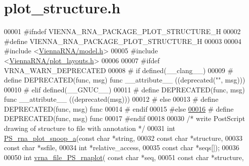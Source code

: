 \hypertarget{plot__structure_8h_source}{}\section{plot\+\_\+structure.\+h}
\label{plot__structure_8h_source}

\begin{DoxyCode}
00001 \textcolor{preprocessor}{#ifndef VIENNA\_RNA\_PACKAGE\_PLOT\_STRUCTURE\_H}
00002 \textcolor{preprocessor}{#define VIENNA\_RNA\_PACKAGE\_PLOT\_STRUCTURE\_H}
00003 
00004 \textcolor{preprocessor}{#include <\mbox{\hyperlink{model_8h}{ViennaRNA/model.h}}>}
00005 \textcolor{preprocessor}{#include <\mbox{\hyperlink{plot__layouts_8h}{ViennaRNA/plot\_layouts.h}}>}
00006 
00007 \textcolor{preprocessor}{#ifdef VRNA\_WARN\_DEPRECATED}
00008 \textcolor{preprocessor}{# if defined(\_\_clang\_\_)}
00009 \textcolor{preprocessor}{#  define DEPRECATED(func, msg) func \_\_attribute\_\_ ((deprecated("", msg)))}
00010 \textcolor{preprocessor}{# elif defined(\_\_GNUC\_\_)}
00011 \textcolor{preprocessor}{#  define DEPRECATED(func, msg) func \_\_attribute\_\_ ((deprecated(msg)))}
00012 \textcolor{preprocessor}{# else}
00013 \textcolor{preprocessor}{#  define DEPRECATED(func, msg) func}
00014 \textcolor{preprocessor}{# endif}
00015 \textcolor{preprocessor}{#else}
\mbox{\hyperlink{plot__structure_8h_aab347a3c03fbe8e7319551b9fa0cce4a}{00016}} \textcolor{preprocessor}{# define DEPRECATED(func, msg) func}
00017 \textcolor{preprocessor}{#endif}
00018 
00030 \textcolor{comment}{/* write PostScript drawing of structure to file with annotation */}
00031 \textcolor{keywordtype}{int} \mbox{\hyperlink{plot__structure_8h_a6d0abe209468084b5a24c837e2d222a6}{PS\_rna\_plot\_snoop\_a}}(\textcolor{keyword}{const} \textcolor{keywordtype}{char} *\textcolor{keywordtype}{string},
00032                         \textcolor{keyword}{const} \textcolor{keywordtype}{char} *structure,
00033                         \textcolor{keyword}{const} \textcolor{keywordtype}{char} *ssfile,
00034                         \textcolor{keywordtype}{int} *relative\_access,
00035                         \textcolor{keyword}{const} \textcolor{keywordtype}{char} *seqs[]);
00036 
00050 \textcolor{keywordtype}{int} \mbox{\hyperlink{plot__structure_8h_abdc8f6548ba4a3bc3cd868ccbcfdb86a}{vrna\_file\_PS\_rnaplot}}( \textcolor{keyword}{const} \textcolor{keywordtype}{char} *seq,
00051                           \textcolor{keyword}{const} \textcolor{keywordtype}{char} *structure,

\end{DoxyCode}
